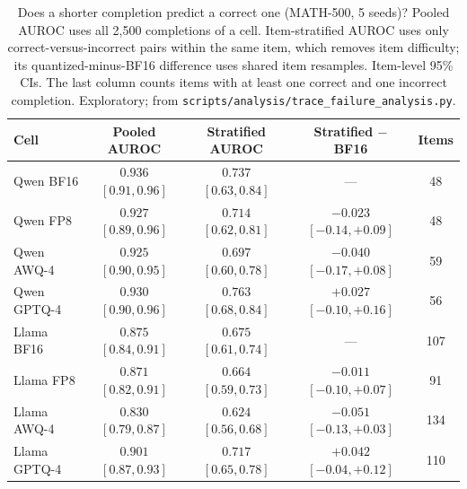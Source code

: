 \documentclass[11pt,a4paper]{article}
\begin{document}
\begin{table}[t]
\centering
\caption{Does a shorter completion predict a correct one (MATH-500, 5 seeds)? Pooled AUROC uses all 2{,}500 completions of a cell. Item-stratified AUROC uses only correct-versus-incorrect pairs within the same item, which removes item difficulty; its quantized-minus-BF16 difference uses shared item resamples. Item-level 95\% CIs. The last column counts items with at least one correct and one incorrect completion. Exploratory; from \texttt{scripts/analysis/trace\_failure\_analysis.py}.}
\label{tab:auroc}
\footnotesize
\setlength{\tabcolsep}{3pt}
\begin{tabular}{lcccc}
\toprule
\textbf{Cell} & \textbf{Pooled AUROC} & \textbf{Stratified AUROC} & \textbf{Stratified $-$ BF16} & \textbf{Items} \\
\midrule
Qwen BF16 & $0.936$ $[0.91,0.96]$ & $0.737$ $[0.63,0.84]$ & --- & 48 \\
Qwen FP8 & $0.927$ $[0.89,0.96]$ & $0.714$ $[0.62,0.81]$ & $-0.023$ $[-0.14,+0.09]$ & 48 \\
Qwen AWQ-4 & $0.925$ $[0.90,0.95]$ & $0.697$ $[0.60,0.78]$ & $-0.040$ $[-0.17,+0.08]$ & 59 \\
Qwen GPTQ-4 & $0.930$ $[0.90,0.96]$ & $0.763$ $[0.68,0.84]$ & $+0.027$ $[-0.10,+0.16]$ & 56 \\
\midrule
Llama BF16 & $0.875$ $[0.84,0.91]$ & $0.675$ $[0.61,0.74]$ & --- & 107 \\
Llama FP8 & $0.871$ $[0.82,0.91]$ & $0.664$ $[0.59,0.73]$ & $-0.011$ $[-0.10,+0.07]$ & 91 \\
Llama AWQ-4 & $0.830$ $[0.79,0.87]$ & $0.624$ $[0.56,0.68]$ & $-0.051$ $[-0.13,+0.03]$ & 134 \\
Llama GPTQ-4 & $0.901$ $[0.87,0.93]$ & $0.717$ $[0.65,0.78]$ & $+0.042$ $[-0.04,+0.12]$ & 110 \\
\bottomrule
\end{tabular}
\end{table}
\end{document}
